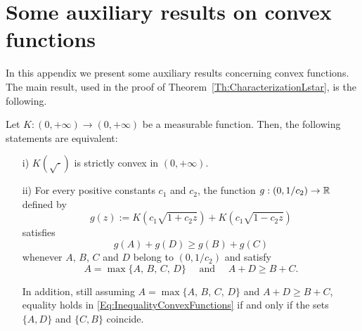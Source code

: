 \section{Some auxiliary results on convex functions}
\label{Sec:AuxiliaryResults}

In this appendix we present some auxiliary results concerning convex functions. The main result, used in the proof of Theorem~\ref{Th:CharacterizationLstar}, is the following.



\begin{proposition}
	\label{Prop:EquivalenceK(sqrt)Convex<->Inequality}
	Let $K:(0, +\infty) \to (0,+\infty)$ be a measurable function. Then, the following statements are equivalent:
	\begin{enumerate}
		\item[i)] $K(\sqrt{\cdot})$ is strictly convex in $(0, +\infty)$.
		\item[ii)] For every positive constants $c_1$ and $c_2$, the function $g:(0,1/c_2)\to \mathbb{R}$ defined by
		\begin{equation}
		\label{Eq:DefinitiongFromK}
		g(z) := K(c_1 \sqrt{1 + c_2z}) + K(c_1 \sqrt{1 - c_2z})
		\end{equation}
		satisfies 
		\begin{equation}
		\label{Eq:InequalityConvexFunctions}
		g(A) + g(D) \geq g(B) + g(C)
		\end{equation}
		whenever $A$, $B$, $C$ and $D$ belong to $(0, 1/c_2)$ and satisfy
		$$
		A = \max\{A,\, B,\, C,\, D\} \quad \text{ and } \quad A + D \geq B + C.
		$$
		
		In addition, still assuming $A = \max\{A,\, B,\, C,\, D\}$ and $A + D \geq B + C$, equality holds in \eqref{Eq:InequalityConvexFunctions} if and only if the sets $\{A,D\}$ and $\{C,B\}$ coincide.	
	\end{enumerate}
\end{proposition}



